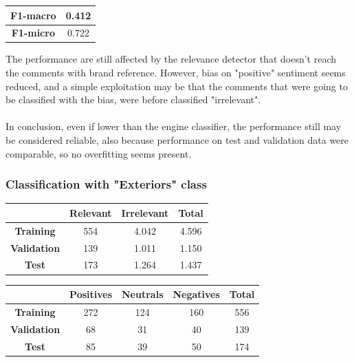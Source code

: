 \begin{center}
	\begin{tabular}{ | c | c | } 
		\hline
		\textbf{F1-macro} & 0.412 \\
		\hline
		\textbf{F1-micro} & 0.722 \\ 
		\hline
	\end{tabular}
\end{center}

The performance are still affected by the relevance detector that doesn't reach the comments with brand reference. However, bias on "positive" sentiment seems reduced, and a simple exploitation may be that the comments that were going to be classified with the bias, were before classified "irrelevant".\\\\
In conclusion, even if lower than the engine classifier, the performance still may be considered reliable, also because performance on test and validation data were comparable, so no overfitting seems present.




\subsubsection{Classification with "Exteriors" class}


\begin{center}
	\begin{tabular}{ | c  c  c | c | } 
		\hline
		& \textbf{Relevant} & \textbf{Irrelevant} & \textbf{Total} \\
		\hline
		\textbf{Training} & 554 & 4.042 & 4.596 \\ 
		\hline
		\textbf{Validation} & 139 & 1.011 & 1.150 \\ 
		\hline
		\textbf{Test} & 173 & 1.264 & 1.437 \\
		\hline
	\end{tabular}
\end{center}


\begin{center}
	\begin{tabular}{ | c  c  c c | c | } 
		\hline
		& \textbf{Positives} & \textbf{Neutrals} & \textbf{Negatives} & \textbf{Total} \\
		\hline
		\textbf{Training} & 272 & 124 & 160 & 556 \\ 
		\hline
		\textbf{Validation} & 68 & 31 & 40 & 139 \\ 
		\hline
		\textbf{Test} & 85 & 39 & 50 & 174 \\
		\hline
	\end{tabular}
\end{center}


